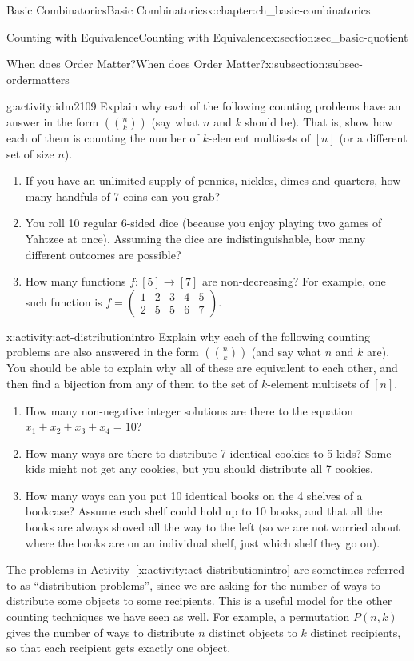 \documentclass[oneside,10pt,]{book}
\numberwithin{equation}{chapter}
\newcommand{\mchoose}[2]{\left(\!\binom{#1}{#2}\!\right)}
\newcommand{\twoline}[2]{\begin{pmatrix}#1 \\ #2 \end{pmatrix}}
\newcommand{\amp}{&}
\begin{document}
\begin{chapterptx}{Basic Combinatorics}{}{Basic Combinatorics}{}{}{x:chapter:ch_basic-combinatorics}
\begin{sectionptx}{Counting with Equivalence}{}{Counting with Equivalence}{}{}{x:section:sec_basic-quotient}
\begin{subsectionptx}{When does Order Matter?}{}{When does Order Matter?}{}{}{x:subsection:subsec-ordermatters}
\begin{activity}{}{g:activity:idm2109}
Explain why each of the following counting problems have an answer in the form \(\mchoose{n}{k}\) (say what \(n\) and \(k\) should be).  That is, show how each of them is counting the number of \(k\)-element multisets of \([n]\) (or a different set of size \(n\)).%
\begin{enumerate}[font=\bfseries,label=(\alph*),ref=\alph*]
\item{}If you have an unlimited supply of pennies, nickles, dimes and quarters, how many handfuls of 7 coins can you grab?%
\item{}You roll 10 regular 6-sided dice (because you enjoy playing two games of Yahtzee at once).  Assuming the dice are indistinguishable, how many different outcomes are possible?%
\item{}How many functions \(f:[5] \to [7]\) are non-decreasing?  For example, one such function is \(f = \twoline{1 \amp 2 \amp 3 \amp 4 \amp 5}{2 \amp 5 \amp 5 \amp 6 \amp 7}\).%
\end{enumerate}
\end{activity}
\begin{activity}{}{x:activity:act-distributionintro}%
Explain why each of the following counting problems are also answered in the form \(\mchoose{n}{k}\) (and say what \(n\) and \(k\) are).  You should be able to explain why all of these are equivalent to each other, and then find a bijection from any of them to the set of \(k\)-element multisets of \([n]\).%
\begin{enumerate}[font=\bfseries,label=(\alph*),ref=\alph*]
\item{}How many non-negative integer solutions are there to the equation \(x_1 + x_2 + x_3 + x_4 = 10\)?%
\item{}How many ways are there to distribute 7 identical cookies to 5 kids? Some kids might not get any cookies, but you should distribute all 7 cookies.%
\item{}How many ways can you put 10 identical books on the 4 shelves of a bookcase?  Assume each shelf could hold up to 10 books, and that all the books are always shoved all the way to the left (so we are not worried about where the books are on an individual shelf, just which shelf they go on).%
\end{enumerate}
\end{activity}
The problems in \hyperref[x:activity:act-distributionintro]{Activity~\ref{x:activity:act-distributionintro}} are sometimes referred to as ``distribution problems'', since we are asking for the number of ways to distribute some objects to some recipients.   This is a useful model for the other counting techniques we have seen as well.  For example, a permutation \(P(n,k)\) gives the number of ways to distribute \(n\) distinct objects to \(k\) distinct recipients, so that each recipient gets exactly one object.%

\end{subsectionptx}
\end{sectionptx}
\end{chapterptx}
\end{document}
